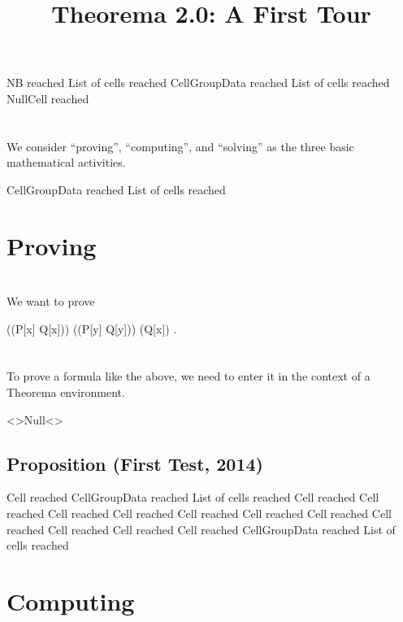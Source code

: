 \documentclass{article}
\newcommand{\light}[1]{{\color{lightgray}#1}}
\begin{document}
% 

\title{Theorema 2.0: A First Tour}
\author{}
\date{}
\maketitle

\light{NB reached} \light{List of cells reached} \light{CellGroupData reached} \light{List of cells reached} Null\light{Cell reached} \begingroup \section*{} We consider “proving”, “computing”, and “solving” as the three basic mathematical activities.\endgroup 

\light{CellGroupData reached} \light{List of cells reached} \section{Proving}

\begingroup \section*{} We want to prove\endgroup 

\begin{center}((P[x] \lor Q[x])) \land ((P[y] \Rightarrow Q[y])) \Leftrightarrow (Q[x]) .\end{center}
\begingroup \section*{} To prove a formula like the above, we need to enter it in the context of a Theorema environment.\endgroup 

\begin{openenvironment}
\end{openenvironment}\begin{tmaenvironment}                     <>Null<>\end{tmaenvironment}
\subsection{Proposition (First Test, 2014)}
\light{Cell reached} \light{CellGroupData reached} \light{List of cells reached} \light{Cell reached} \light{Cell reached} \light{Cell reached} \light{Cell reached} \light{Cell reached} \light{Cell reached} \light{Cell reached} \light{Cell reached} \light{Cell reached} \light{Cell reached} \light{Cell reached} \light{CellGroupData reached} \light{List of cells reached} \section{Computing}
\end{document}
